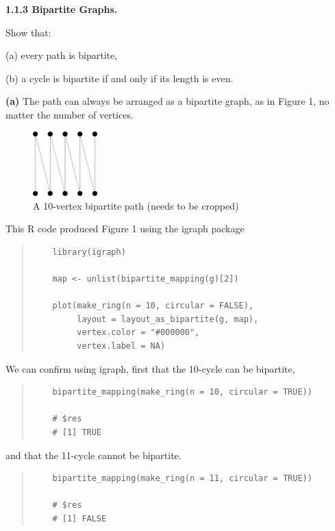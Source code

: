 \documentclass{article}
\begin{document}
\bigskip\par\noindent\textbf{1.1.3 Bipartite Graphs.}
\par\smallskip
Show that:
\par (a) every path is bipartite,
\par (b) a cycle is bipartite if and only if its length is even.
\par\smallskip
\textbf{(a)} The path can always be arranged as a bipartite graph, as in Figure 1, no matter the number of vertices.
\begin{figure}[h]
\centering
\includegraphics[width = 25mm]{1.1.3a.pdf}
\caption{\footnotesize{A 10-vertex bipartite path (needs to be cropped)}}
\end{figure}

This R code produced Figure 1 using the igraph package
\begin{quote}
\begin{verbatim}
	library(igraph)
	
	map <- unlist(bipartite_mapping(g)[2])
	
	plot(make_ring(n = 10, circular = FALSE),
	     layout = layout_as_bipartite(g, map),
	     vertex.color = "#000000",
	     vertex.label = NA)
\end{verbatim}
\end{quote}
We can confirm using igraph, first that the 10-cycle can be bipartite,
\begin{quote}
\begin{verbatim}
	bipartite_mapping(make_ring(n = 10, circular = TRUE))
	
	# $res
	# [1] TRUE
\end{verbatim}
\end{quote}
and that the 11-cycle cannot be bipartite.
\begin{quote}
\begin{verbatim}
	bipartite_mapping(make_ring(n = 11, circular = TRUE))
	
	# $res
	# [1] FALSE
\end{verbatim}
\end{quote}
\end{document}
